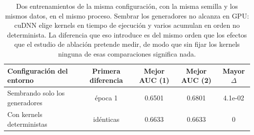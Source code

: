 \begin{table}[ht]
\centering
\caption{Dos entrenamientos de la misma configuración, con la misma semilla y los mismos datos, en el mismo proceso. Sembrar los generadores no alcanza en GPU: cuDNN elige kernels en tiempo de ejecución y varios acumulan en orden no determinista. La diferencia que eso introduce es del mismo orden que los efectos que el estudio de ablación pretende medir, de modo que sin fijar los kernels ninguna de esas comparaciones significa nada.}
\label{tab:determinismo}
\begin{tabular}{lcccc}
\toprule
Configuración del entorno & Primera diferencia & Mejor AUC (1) & Mejor AUC (2) & Mayor $\Delta$ \\
\midrule
Sembrando solo los generadores & época 1 & 0.6501 & 0.6801 & 4.1e-02 \\
Con kernels deterministas & idénticas & 0.6633 & 0.6633 & 0 \\
\bottomrule
\end{tabular}
\end{table}
